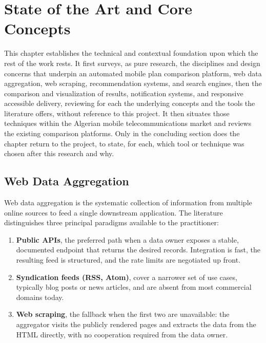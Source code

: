 
\chapter{State of the Art and Core Concepts}

This chapter establishes the technical and contextual foundation upon which the rest of the work rests. It first surveys, as pure research, the disciplines and design concerns that underpin an automated mobile plan comparison platform, web data aggregation, web scraping, recommendation systems, and search engines, then the comparison and visualization of results, notification systems, and responsive accessible delivery, reviewing for each the underlying concepts and the tools the literature offers, without reference to this project. It then situates those techniques within the Algerian mobile telecommunications market and reviews the existing comparison platforms. Only in the concluding section does the chapter return to the project, to state, for each, which tool or technique was chosen after this research and why.

\section{Web Data Aggregation}

Web data aggregation is the systematic collection of information from multiple online sources to feed a single downstream application. The literature distinguishes three principal paradigms available to the practitioner:

\begin{enumerate}
  \item \textbf{Public APIs}, the preferred path when a data owner exposes a stable, documented endpoint that returns the desired records. Integration is fast, the resulting feed is structured, and the rate limits are negotiated up front.
  \item \textbf{Syndication feeds (RSS, Atom)}, cover a narrower set of use cases, typically blog posts or news articles, and are absent from most commercial domains today.
  \item \textbf{Web scraping}, the fallback when the first two are unavailable: the aggregator visits the publicly rendered pages and extracts the data from the HTML directly, with no cooperation required from the data owner.
\end{enumerate}

